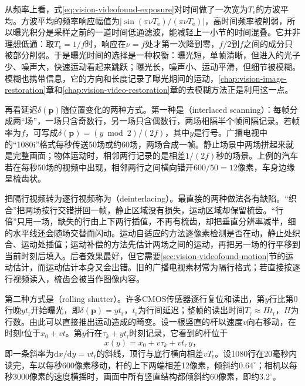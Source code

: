 从频率上看，式\eqref{eq:vision-videofound-exposure}对时间做了一次宽为$T_{\mathrm e}$的方波平均。方波平均的频率响应幅值为$|\sin(\pi\nu T_{\mathrm e})/(\pi\nu T_{\mathrm e})|$，高时间频率被削弱，所以曝光积分是采样之前的一道时间低通滤波，能减轻上一小节的时间混叠。它并非理想低通：取$T_{\mathrm e}=1/f$时，响应在$\nu=f$处才第一次降到零，$f/2$到$f$之间的成分只被部分削弱。于是曝光时间的选择是一种权衡：曝光短，单帧清晰，但进入的光子少、噪声大，快速运动看起来跳跃；曝光长，噪声小、运动平滑，但细节被模糊。模糊也携带信息，它的方向和长度记录了曝光期间的运动，\ref{chap:vision-image-restoration}章和\ref{chap:vision-video-restoration}章的去模糊方法正是利用这一点。

再看延迟$\delta(\bm p)$随位置变化的两种方式。第一种是（interlaced scanning）：每帧分成两“场”，一场只含奇数行，另一场只含偶数行，两场相隔半个帧间隔记录。若帧率为$f$，可写成$\delta(\bm p)=(y\bmod2)/(2f)$，其中$y$是行号。广播电视中的“1080i”格式每秒传送50场或约60场，两场合成一帧。静止场景中两场拼起来就是完整画面；物体运动时，相邻两行记录的是相差$1/(2f)$秒的场景。上例的汽车若在每秒50场的视频中出现，相邻两行之间横向错开$600/50=12$像素，车身边缘呈梳齿状。

把隔行视频转为逐行视频称为（deinterlacing）。最直接的两种做法各有缺陷。“织合”把两场按行交错拼回一帧，静止区域没有损失，运动区域却保留梳齿。“行倍”只用一场，缺失的行由上下两行插值，不再有梳齿，却把垂直分辨率减半，细的水平线还会随场交替而闪动。运动自适应的方法逐像素检测是否在动，静止处织合、运动处插值；运动补偿的方法先估计两场之间的运动，再把另一场的行平移到当前时刻后填入。后者效果最好，但它需要\ref{sec:vision-videofound-motion}节的运动估计，而运动估计本身又会出错。旧的广播电视素材常为隔行格式；若直接按逐行视频读入，梳齿会被当作图像内容。

第二种方式是（rolling shutter）。许多CMOS传感器逐行复位和读出，第$y$行比第0行晚$y t_{\mathrm r}$开始曝光，即$\delta(\bm p)=y t_{\mathrm r}$，$t_{\mathrm r}$为行间延迟；整帧的读出时间$T_{\mathrm r}\approx Ht_{\mathrm r}$，$H$为行数。由此可以直接推出运动造成的畸变。设一根竖直的杆以速度$v$向右移动，在时刻$t$位于$x_0+vt$。第$y$行在$\tau_k+yt_{\mathrm r}$时刻记录，它看到的杆位于
\begin{equation}
  x(y)=x_0+v\tau_k+v t_{\mathrm r}\,y\text{，}
  \label{eq:vision-videofound-rolling-skew}
\end{equation}
即一条斜率为$\mathrm{d}x/\mathrm{d}y=vt_{\mathrm r}$的斜线，顶行与底行横向相差$vT_{\mathrm r}$。设1080行在20毫秒内读完，车以每秒600像素移动，杆的上下两端相差12像素，倾斜约$0.64^\circ$；相机以每秒3000像素的速度横摇时，画面中所有竖直结构都倾斜约60像素，即约$3.2^\circ$。

